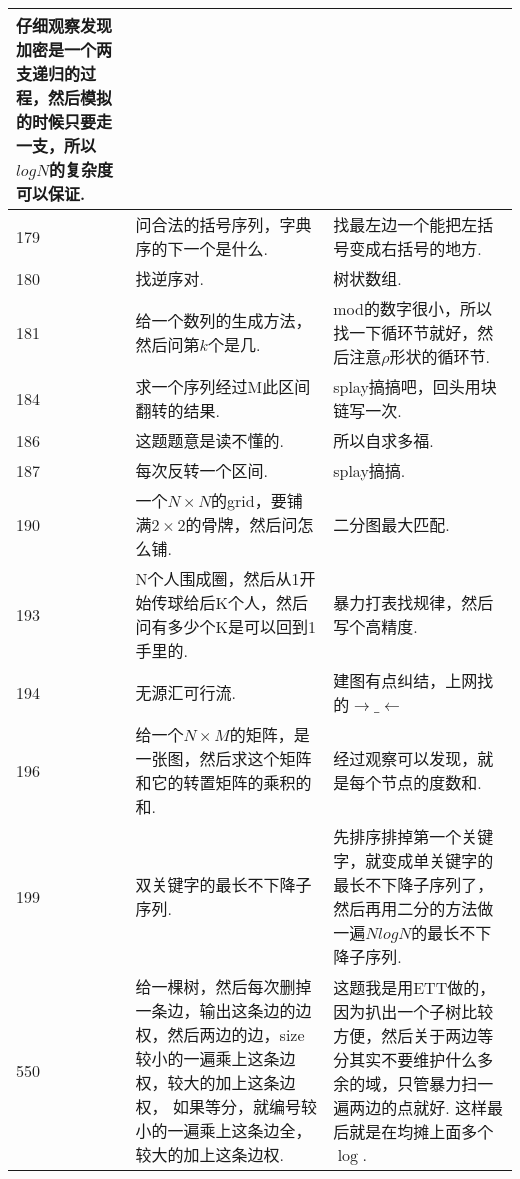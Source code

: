 \documentclass{article}
\begin{document}
\begin{longtable}{|p{1cm}|p{5cm}|p{5cm}|}
			仔细观察发现加密是一个两支递归的过程，然后模拟的时候只要走一支，所以$logN$的复杂度可以保证.\\
			\hline
			179 &
			问合法的括号序列，字典序的下一个是什么.&
			找最左边一个能把左括号变成右括号的地方.\\
			\hline
			180 &
			找逆序对. &
			树状数组.\\
			181 &
			给一个数列的生成方法，然后问第$k$个是几.&
			mod的数字很小，所以找一下循环节就好，然后注意$\rho$形状的循环节.\\
			\hline
			184 &
			求一个序列经过M此区间翻转的结果. &
			splay搞搞吧，回头用块链写一次.\\
			\hline
			186 &
			这题题意是读不懂的.&
			所以自求多福.\\
			\hline
			187 & 
			每次反转一个区间.&
			splay搞搞.\\
			\hline
			190 &
			一个$N\times N$的grid，要铺满$2\times 2$的骨牌，然后问怎么铺. &
			二分图最大匹配.\\
			\hline
			193 &
			N个人围成圈，然后从1开始传球给后K个人，然后问有多少个K是可以回到1手里的. &
			暴力打表找规律，然后写个高精度.\\
			\hline
			194 &
			无源汇可行流. &
			建图有点纠结，上网找的$\rightarrow\_\leftarrow$\\
			\hline
			196 &
			给一个$N\times M$的矩阵，是一张图，然后求这个矩阵和它的转置矩阵的乘积的和.&
			经过观察可以发现，就是每个节点的度数和.\\
			\hline
			199 &
			双关键字的最长不下降子序列.&
			先排序排掉第一个关键字，就变成单关键字的最长不下降子序列了，然后再用二分的方法做一遍$NlogN$的最长不下降子序列.\\
			\hline
			550 &
			给一棵树，然后每次删掉一条边，输出这条边的边权，然后两边的边，size较小的一遍乘上这条边权，较大的加上这条边权，
			如果等分，就编号较小的一遍乘上这条边全，较大的加上这条边权.&
			这题我是用ETT做的，因为扒出一个子树比较方便，然后关于两边等分其实不要维护什么多余的域，只管暴力扫一遍两边的点就好.
			这样最后就是在均摊上面多个$\log$.\\
			\hline
		\end{longtable}
\end{document}
